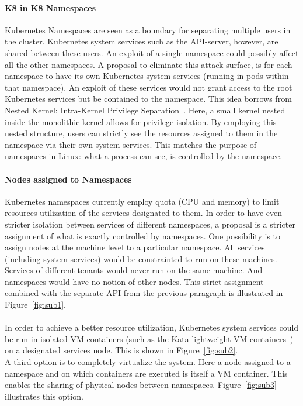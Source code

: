 \paragraph{K8 in K8 Namespaces}
Kubernetes Namespaces are seen as a boundary for separating multiple users in the cluster. Kubernetes system services such as the API-server, however, are shared between these users. An exploit of a single namespace could possibly affect all the other namespaces. A proposal to eliminate this attack surface, is for each namespace to have its own Kubernetes system services (running in pods within that namespace). An exploit of these services would not grant access to the root Kubernetes services but be contained to the namespace. This idea borrows from Nested Kernel: Intra-Kernel Privilege Separation~\cite{dautenhahn2015nested}. Here, a small kernel nested inside the monolithic kernel allows for privilege isolation. By employing this nested structure,  users can strictly see the resources assigned to them in the namespace via their own system services. This matches the purpose of namespaces in Linux: what a process can see, is controlled by the namespace.~\cite{hardmultiproposals}

\paragraph{Nodes assigned to Namespaces}
Kubernetes namespaces currently employ quota (CPU and memory) to limit resources utilization of the services designated to them. In order to have even stricter isolation between services of different namespaces, a proposal is  a stricter assignment of what is exactly controlled by namespaces.
One possibility is to assign nodes at the machine level to a particular namespace. All services (including system services) would be constrainted to run on these machines. Services of different tenants would never run on the same machine. And namespaces would have no notion of other nodes. This strict assignment combined with the separate API from the previous paragraph is illustrated in Figure~\ref{fig:sub1}.~\cite{hardmultiproposals}\\\\
In order to achieve a better resource utilization, Kubernetes system services could be run in isolated VM containers (such as the Kata lightweight VM containers~\cite{katacontainers}) on a designated services node. This is shown in Figure~\ref{fig:sub2}.~\cite{hardmultiproposals}\\
A third option is to  completely virtualize the system. Here a node assigned to a namespace and on which containers are executed is itself a VM container. This enables the sharing of physical nodes between namespaces.  Figure~\ref{fig:sub3} illustrates this option.~\cite{hardmultiproposals}

